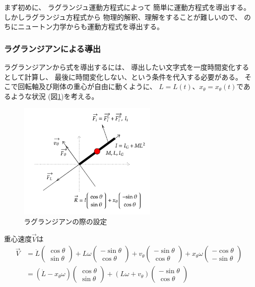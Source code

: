 \documentclass[a4paper,11pt]{jsarticle}
\begin{document}
まず初めに、
ラグランジュ運動方程式によって
簡単に運動方程式を導出する。
しかしラグランジュ方程式から
物理的解釈、理解をすることが難しいので、
のちにニュートン力学からも運動方程式を導出する。

\subsubsection{ラグランジアンによる導出}

ラグランジアンから式を導出するには、
導出したい文字式を一度時間変化するとして計算し、
最後に時間変化しない、という条件を代入する必要がある。
そこで回転軸及び剛体の重心が自由に動くように、
$L=L(t)$、$x_\theta=x_\theta(t)$であるような状況
(図\ref{Appendix_lag_config.png})を考える。

\begin{figure}[h]
  \centering
  \includegraphics[width = 0.6\textwidth]{Appendix_lag_config.png}
  \caption{ラグランジアンの際の設定}
  \label{Appendix_lag_config.png}
\end{figure}

重心速度$\vec{V}$は
\begin{align*}
  \vec{V} &= 
  \dot{L}
  \begin{pmatrix}
    \cos\theta
    \\
    \sin\theta
  \end{pmatrix}
  + L\omega
  \begin{pmatrix}
    -\sin\theta
    \\
    \cos\theta
  \end{pmatrix}
  + v_\theta \begin{pmatrix}
    -\sin\theta
    \\
    \cos\theta
  \end{pmatrix}
  + x_\theta \omega \begin{pmatrix}
    -\cos\theta
    \\
    -\sin\theta
  \end{pmatrix}
  \\
  &= 
  ( \dot{L} - x_\theta \omega )
  \begin{pmatrix}
    \cos\theta
    \\
    \sin\theta
  \end{pmatrix}
  + ( L\omega + v_\theta )
  \begin{pmatrix}
    -\sin\theta
    \\
    \cos\theta
  \end{pmatrix}
\end{align*}
\end{document}
